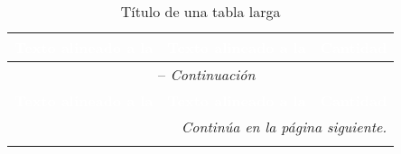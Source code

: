 \begin{longtable}{l|r|c}
  \caption{Título de una tabla larga}
  \label{tab:longtable} \\

  \rowcolor{ficblue!50}
  \textcolor{white}{\textbf{Texto alineado a la}} & \textcolor{white}{\textbf{Texto alineado a la}} & \textcolor{white}{\textbf{Cantidad}} \\\hline
  \endfirsthead

  \multicolumn{3}{c}{\tablename\ \thetable{} -- {\textit{Continuación}}} \\
  \rowcolor{ficblue!50}
  \textcolor{white}{\textbf{Texto alineado a la }} & \textcolor{white}{\textbf{Texto alineado a la}} & \textcolor{white}{\textbf{Cantidad}} \\\hline
  \endhead

  \multicolumn{3}{r}{\textit{Continúa en la página siguiente.}} \\
  \endfoot

  \endlastfoot


\end{longtable}
